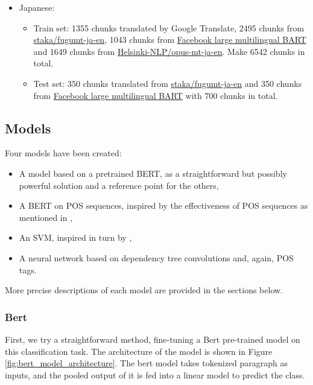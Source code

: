 \documentclass[twocolumn]{article}
\begin{document}
\begin{itemize}
	\item Japanese:
	\begin{itemize}
            \item Train set: 1355 chunks translated by Google Translate, 2495 chunks from \href{https://huggingface.co/staka/fugumt-ja-en}{staka/fugumt-ja-en}, 1043 chunks from \href{https://huggingface.co/facebook/mbart-large-50-many-to-one-mmt}{Facebook large multilingual BART} and 1649 chunks from \href{https://huggingface.co/Helsinki-NLP/opus-mt-ja-en}{Helsinki-NLP/opus-mt-ja-en}. Make 6542 chunks in total.
            \item Test set: 350 chunks translated from \href{https://huggingface.co/staka/fugumt-ja-en}{staka/fugumt-ja-en} and 350 chunks from \href{https://huggingface.co/facebook/mbart-large-50-many-to-one-mmt}{Facebook large multilingual BART} with 700 chunks in total.
        \end{itemize}
\end{itemize}

\subsection*{Models}

Four models have been created:

\begin{itemize}
	\item A model based on a pretrained BERT, as a straightforward but possibly powerful solution and a reference point for the others,
	\item A BERT on POS sequences, inspired by the effectiveness of POS sequences as mentioned in \cite{canada},
	\item An SVM, inspired in turn by \cite{literary},
	\item A neural network based on dependency tree convolutions and, again, POS tags.
\end{itemize}

More precise descriptions of each model are provided in the sections below.

\subsubsection*{Bert}

First, we try a straightforward method, fine-tuning a Bert pre-trained model on this classification task. The architecture of the model is shown in Figure \ref{fig:bert_model_architecture}.
The bert model takes tokenized paragraph as inputs, and the pooled output of it is fed into a linear model to predict the class. 
\end{document}
